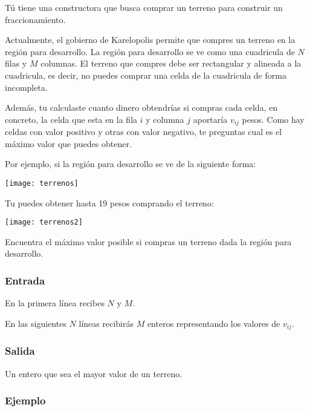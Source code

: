 Tú tiene una constructora que busca comprar un terreno para construir un fraccionamiento.

Actualmente, el gobierno de Karelopolis permite que compres un terreno en la región para desarrollo. La región para desarrollo se ve como una cuadricula de \(N\) filas y \(M\) columnas. El terreno que compres debe ser rectangular y alineada a la cuadricula, es decir, no puedes comprar una celda de la cuadricula de forma incompleta.

Además, tu calculaste cuanto dinero obtendrías si compras cada celda, en concreto, la celda que esta en la fila \(i\) y columna \(j\) aportaría \(v_{ij}\) pesos. Como hay celdas con valor positivo y otras con valor negativo, te preguntas cual es el máximo valor que puedes obtener.

Por ejemplo, si la región para desarrollo se ve de la siguiente forma:

\begin{center}
	\texttt{[image: terrenos]}
\end{center}

Tu puedes obtener hasta 19 pesos comprando el terreno:

\begin{center}
	\texttt{[image: terrenos2]}
\end{center}


Encuentra el máximo valor posible si compras un terreno dada la región para desarrollo.

\subsubsection*{Entrada}

En la primera línea recibes \(N\) y \(M\).

En las siguientes \(N\) líneas recibirás \(M\) enteros representando los valores de \(v_{ij}\).

\subsubsection*{Salida}

Un entero que sea el mayor valor de un terreno.

\subsubsection*{Ejemplo}

\begin{casebox2}
	\hline
\end{casebox2}

